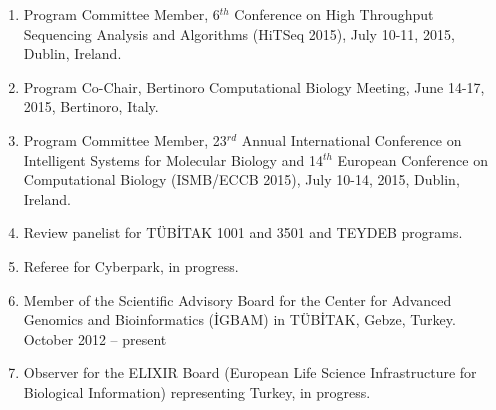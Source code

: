 \begin{enumerate}

\item
  Program Committee Member, 6$^{th}$ Conference on High Throughput Sequencing Analysis and Algorithms (HiTSeq 2015), July 10-11, 2015, Dublin, Ireland.
\item
  Program Co-Chair, Bertinoro Computational Biology Meeting, June 14-17, 2015, Bertinoro, Italy.
\item
  Program Committee Member, 23$^{rd}$ Annual International Conference on Intelligent Systems for Molecular Biology and 14$^{th}$ European Conference on 
  Computational Biology  (ISMB/ECCB 2015), 
  July 10-14, 2015, Dublin, Ireland.
\item Review panelist for  TÜBİTAK 1001 and 3501 and TEYDEB programs.
\item Referee for Cyberpark, in progress.
\item Member of the Scientific Advisory Board for the Center for Advanced Genomics and Bioinformatics (İGBAM) in TÜBİTAK, Gebze, Turkey. October 2012 – present
\item Observer for the ELIXIR Board (European Life Science Infrastructure for Biological Information)  representing Turkey, in progress.
\end{enumerate}
